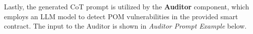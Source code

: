 


Lastly, the generated CoT prompt is utilized by the \textbf{Auditor} component, which employs an LLM model to detect POM vulnerabilities in the provided smart contract.
The input to the Auditor is shown in \textit{Auditor Prompt Example} below.

